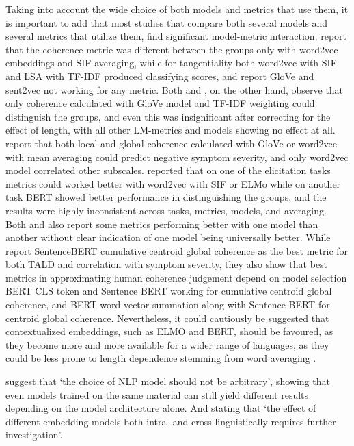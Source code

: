 Taking into account the wide choice of both models and metrics that use them, it is important to add that most studies that compare both several models and several metrics that utilize them, find significant model-metric interaction. \citet{iter2018automatic} report that the coherence metric was different between the groups only with word2vec embeddings and SIF averaging, while for tangentiality both word2vec with SIF and LSA with TF-IDF produced classifying scores, and report GloVe and sent2vec not working for any metric. Both \citet{just2019coherence} and \citet{hitczenko2021understanding}, on the other hand, observe that only coherence calculated with GloVe model and TF-IDF weighting could distinguish the groups, and even this was insignificant after correcting for the effect of length, with all other LM-metrics and models showing no effect at all. \citet{just2023validation} report that both local and global coherence calculated with GloVe or word2vec with mean averaging could predict negative symptom severity, and only word2vec model correlated other subscales. \citet{ryazanskaya2020thesis} reported that on one of the elicitation tasks metrics could worked better with word2vec with SIF or ELMo while on another task BERT showed better performance in distinguishing the groups, and the results were highly inconsistent across tasks, metrics, models, and averaging. Both \citet{xu2020centroid} and \citet{xu2022fully} also report some metrics performing better with one model than another without clear indication of one model being universally better. While \citet{xu2022fully} report SentenceBERT cumulative centroid global coherence as the best metric for both TALD and correlation with symptom severity, they also show that best metrics in approximating human coherence judgement depend on model selection BERT CLS token and Sentence BERT working for cumulative centroid global coherence, and BERT word vector summation along with Sentence BERT for centroid global coherence. Nevertheless, it could cautiously be suggested that contextualized embeddings, such as ELMO and BERT, should be favoured, as they become more and more available for a wider range of languages, as they could be less prone to length dependence stemming from word averaging \citep{fradkin2023theory}.

\citet{just2023validation} suggest that `the choice of NLP model should not be arbitrary', showing that even models trained on the same material can still yield different results depending on the model architecture alone. And stating that `the effect of different embedding models both intra- and cross-linguistically requires further investigation'.

